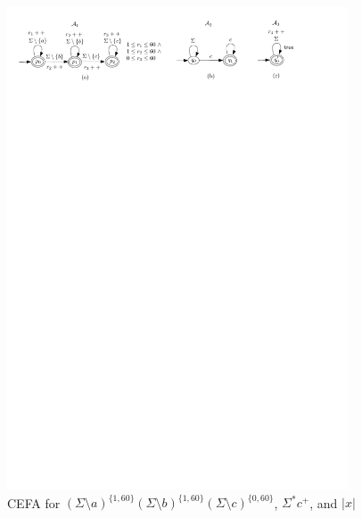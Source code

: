 

\begin{figure}[ht]
\vspace{-3mm}
  \centering
  \includegraphics[width = 0.9\textwidth]{sections/overview-cefa.pdf}
  \caption{CEFA for $(\Sigma \setminus a)^{\{1, 60\}} (\Sigma \setminus b)^{\{1, 60\}} (\Sigma \setminus c)^{\{0, 60\}}$, $\Sigma^* c^+$, and $|x|$}
  \label{fig:overview}
\vspace{-5mm}
\end{figure}

